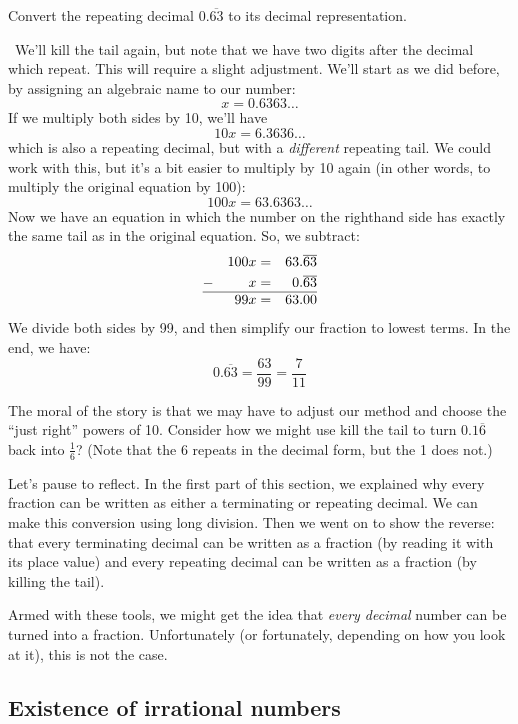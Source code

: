 \begin{boxedex}
Convert the repeating decimal $0.\overline{63}$ to its decimal representation.

\exsoln\ We'll kill the tail again, but note that we have two digits after the decimal which repeat. This will require a slight adjustment. We'll start as we did before, by assigning an algebraic name to our number:\[x = 0.6363\dotso\]
If we multiply both sides by 10, we'll have \[10x = 6.3636\dotso\] which is also a repeating decimal, but with a \textit{different} repeating tail. We could work with this, but it's a bit easier to multiply by 10 again (in other words, to multiply the original equation by 100): \[100x = 63.6363\dotso\] Now we have an equation in which the number on the righthand side has exactly the same tail as in the original equation. So, we subtract:
\[\begin{aligned}
	&&	100x	&= &63.\overline{63}\\
- 	&& 	x 		&= &0.\overline{63}\\\hline
	&&	99x 	&= &63.00
\end{aligned}\] We divide both sides by 99, and then simplify our fraction to lowest terms. In the end, we have: \[0.\overline{63} = \frac{63}{99} = \frac{7}{11}\]
\end{boxedex}

The moral of the story is that we may have to adjust our method and choose the ``just right'' powers of 10. Consider how we might use kill the tail to turn $0.1\overline{6}$ back into $\frac{1}{6}$? (Note that the 6 repeats in the decimal form, but the 1 does not.)

Let's pause to reflect. In the first part of this section, we explained why every fraction can be written as either a terminating or repeating decimal. We can make this conversion using long division. Then we went on to show the reverse: that every terminating decimal can be written as a fraction (by reading it with its place value) and every repeating decimal can be written as a fraction (by killing the tail).

Armed with these tools, we might get the idea that \textit{every decimal} number can be turned into a fraction. Unfortunately (or fortunately, depending on how you look at it), this is not the case.

\subsection{Existence of irrational numbers}

